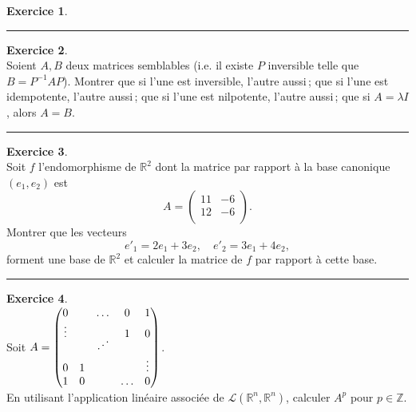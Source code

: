 \documentclass[a4paper,10pt]{article}
\theoremstyle{definition}
\theoremstyle{definition}
\newtheorem{exo}{Exercice}
\newcommand{\R}{\mathbb{R}}
\newcommand{\Z}{\mathbb{Z}}
\begin{document}
\begin{minipage}{1\linewidth}
\begin{minipage}[t]{0.48\linewidth}
\begin{exo}
		
		\centering
		\rule{1\linewidth}{0.6pt}
	\end{exo}
	
	\begin{exo}\quad\\
	
			
		Soient $A, B$ deux matrices semblables (i.e. il existe $P$
		inversible telle que $B = P^{-1} A P$). Montrer que si l'une est
		inversible, l'autre aussi\,; que si l'une est idempotente, l'autre
		aussi\,; que si l'une est nilpotente, l'autre aussi\,; que si $A =
		\lambda I$, alors $A = B$.
		
		\centering
		\rule{1\linewidth}{0.6pt}
	\end{exo}
	
	\begin{exo}\quad\\
		Soit $f$ l'endomorphisme de $\R^2$ dont la matrice par
		rapport \`a la base canonique $(e_1, e_2)$ est
		$$A= \left( 
		\begin{array}{cc}
		11 & -6  \\
		12 & -6  \\
		\end{array}
		\right).$$
		Montrer que les vecteurs
		$$ e'_1 = 2e_1+3e_2,\quad e'_2 = 3e_1+4e_2,$$
		forment une base de $\R^2$ et calculer la matrice de $f$ par
		rapport \`a cette base.	
		
		\centering
		\rule{1\linewidth}{0.6pt}
	\end{exo}

		
		
	\end{minipage}	
	\hfill\vrule\hfill
	\begin{minipage}[t]{0.48\linewidth}
		\raggedright
	
		\begin{exo}\quad\\[0.25cm]
		\def\Ddots{\mathinner{\mkern2mu\raise1pt\hbox{.}\mkern2mu
				\newline \raise4pt\hbox{.}\mkern2mu\raise7pt\hbox{.}\mkern1mu}}
		Soit $A = \begin{pmatrix} 
		0&&\dots&0&1 \\ 
		\vdots&&&1&0 \\
		& &  \Ddots && \\
		0&1& & &\vdots \\ 
		1&0&&\dots&0
		\end{pmatrix}$. 
		\hfil\\[0.25cm] En utilisant l'application linéaire associée de 
		$\mathcal{L} (\R^n,\R^n)$, calculer $A^p$ pour $p \in \Z$.
		

\end{exo}
\end{minipage}
\end{minipage}
\end{document}
